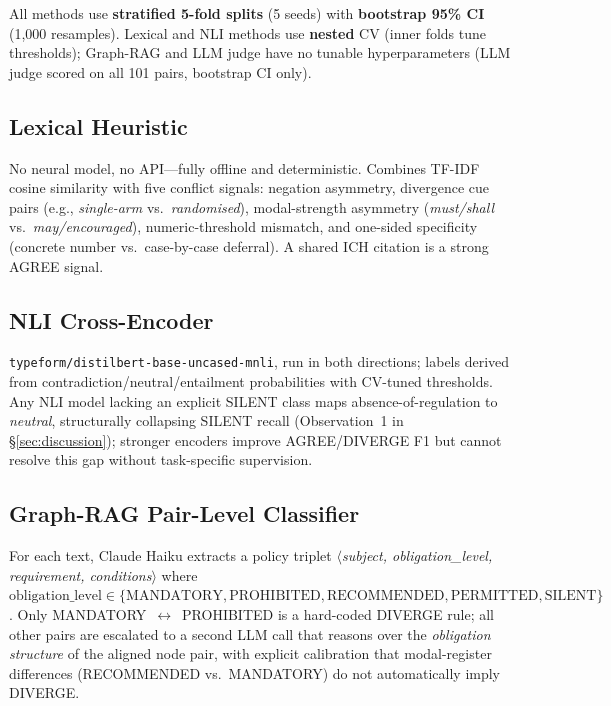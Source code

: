 \documentclass[manuscript]{acmart}
\begin{document}
All methods use \textbf{stratified 5-fold splits} (5 seeds) with
\textbf{bootstrap 95\% CI} (1{,}000 resamples). Lexical and NLI methods use
\textbf{nested} CV (inner folds tune thresholds); Graph-RAG and LLM judge have
no tunable hyperparameters (LLM judge scored on all 101 pairs, bootstrap
CI only).

\subsection{Lexical Heuristic}

No neural model, no API---fully offline and deterministic. Combines TF-IDF
cosine similarity with five conflict signals: negation asymmetry, divergence
cue pairs (e.g., \textit{single-arm} vs.\ \textit{randomised}), modal-strength
asymmetry (\textit{must/shall} vs.\ \textit{may/encouraged}),
numeric-threshold mismatch, and one-sided specificity (concrete number
vs.\ case-by-case deferral). A shared ICH citation is a strong AGREE signal.

\subsection{NLI Cross-Encoder}

\texttt{typeform/distilbert-base-uncased-mnli}, run in both directions; labels
derived from contradiction/neutral/entailment probabilities with CV-tuned
thresholds. Any NLI model lacking an explicit SILENT class maps
absence-of-regulation to \textit{neutral}, structurally collapsing SILENT
recall (Observation~1 in \S\ref{sec:discussion}); stronger encoders improve
AGREE/DIVERGE F1 but cannot resolve this gap without task-specific supervision.

\subsection{Graph-RAG Pair-Level Classifier}

For each text, Claude Haiku extracts a policy triplet
$\langle$\textit{subject, obligation\_level, requirement, conditions}$\rangle$
where $\text{obligation\_level} \in \{\text{MANDATORY}, \text{PROHIBITED},
\text{RECOMMENDED}, \text{PERMITTED}, \text{SILENT}\}$. Only
MANDATORY~$\leftrightarrow$~PROHIBITED is a hard-coded DIVERGE rule; all other
pairs are escalated to a second LLM call that reasons over the
\textit{obligation structure} of the aligned node pair, with explicit
calibration that modal-register differences (RECOMMENDED vs.\ MANDATORY) do not
automatically imply DIVERGE.
\end{document}
